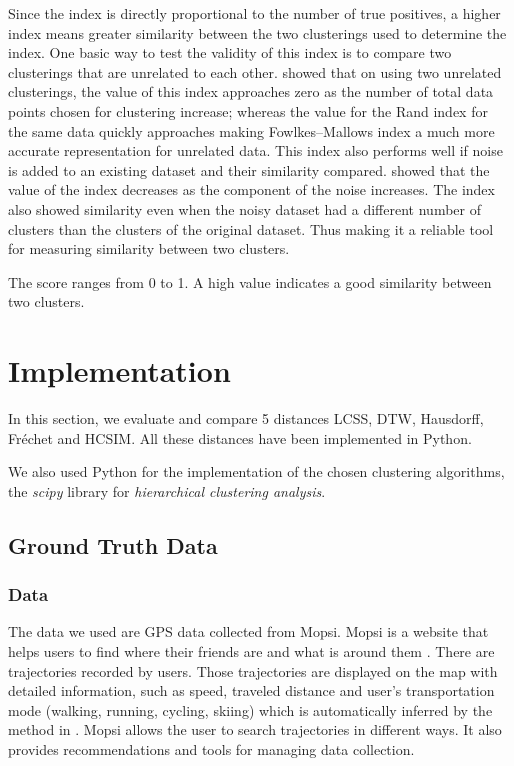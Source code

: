 \documentclass[a4paper, 12pt]{article}
\begin{document}
Since the index is directly proportional to the number of true positives, a higher index means greater similarity between the two clusterings used to determine the index. One basic way to test the validity of this index is to compare two clusterings that are unrelated to each other. \cite{fowlkes1983method} showed that on using two unrelated clusterings, the value of this index approaches zero as the number of total data points chosen for clustering increase; whereas the value for the Rand index \citep{steinley2004properties} for the same data quickly approaches making Fowlkes–Mallows index a much more accurate representation for unrelated data. This index also performs well if noise is added to an existing dataset and their similarity compared. \cite{fowlkes1983method} showed that the value of the index decreases as the component of the noise increases. The index also showed similarity even when the noisy dataset had a different number of clusters than the clusters of the original dataset. Thus making it a reliable tool for measuring similarity between two clusters. 

The score ranges from 0 to 1. A high value indicates a good similarity between two clusters.

\section{Implementation}

In this section, we evaluate and compare 5 distances LCSS, DTW, Hausdorff, Fréchet and HCSIM. All these distances have been implemented in Python. 

We also used Python for the implementation of the chosen clustering algorithms, the \textit{scipy} library for \textit{hierarchical clustering analysis}.

\subsection{Ground Truth Data}

\subsubsection{Data}

The data we used are GPS data collected from Mopsi. Mopsi is a website that helps users to find where their friends are and what is around them \citep{mariescu2013detecting}. There are trajectories recorded by users. Those trajectories are displayed on the map with detailed information, such as speed, traveled distance and user’s transportation mode (walking, running, cycling, skiing) which is automatically inferred by the method in \cite{waga2012detecting}. Mopsi allows the user to search trajectories in different ways. It also provides recommendations and tools for managing data collection.
\end{document}
